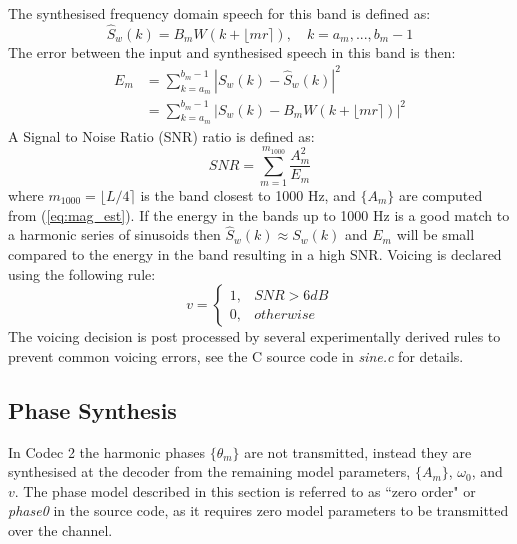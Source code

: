 \documentclass{article}
\begin{document}
{The synthesised frequency domain speech for this band is defined as:
\begin{equation}
\hat{S}_w(k) = B_m W(k + \lfloor mr \rceil), \quad k=a_m,...,b_m-1
\end{equation}
The error between the input and synthesised speech in this band is then:
\begin{equation}
\begin{split}
E_m &= \sum_{k=a_m}^{b_m-1} |S_w(k) - \hat{S}_w(k)|^2 \\
    &=\sum_{k=a_m}^{b_m-1} |S_w(k) - B_m W(k + \lfloor mr \rceil)|^2
\end{split}
\end{equation}
A Signal to Noise Ratio (SNR) ratio is defined as:
\begin{equation}
\label{eq:voicing_snr}
SNR = \sum_{m=1}^{m_{1000}} \frac{A^2_m}{E_m}
\end{equation}
where $m_{1000}= \lfloor L/4 \rceil$ is the band closest to 1000 Hz, and $\{A_m\}$ are computed from (\ref{eq:mag_est}). If the energy in the bands up to 1000 Hz is a good match to a harmonic series of sinusoids then $\hat{S}_w(k) \approx S_w(k)$ and $E_m$ will be small compared to the energy in the band resulting in a high SNR.  Voicing is declared using the following rule:
\begin{equation}
v = \begin{cases}
    1, & SNR > 6 \si{dB} \\
    0, & otherwise
    \end{cases}
\end{equation}
The voicing decision is post processed by several experimentally derived rules to prevent common voicing errors, see the C source code in \emph{sine.c} for details.

\subsection{Phase Synthesis}

In Codec 2 the harmonic phases $\{\theta_m\}$ are not transmitted, instead they are synthesised at the decoder from the remaining model parameters, $\{A_m\}$, $\omega_0$, and $v$.  The phase model described in this section is referred to as ``zero order" or \emph{phase0} in the source code, as it requires zero model parameters to be transmitted over the channel.

}
\end{document}
